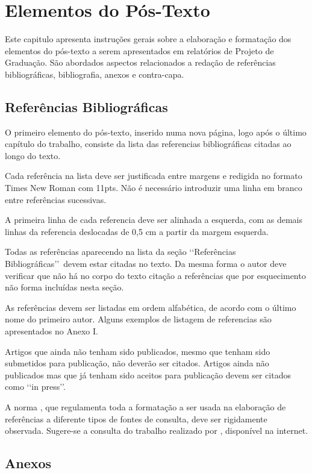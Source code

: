 \chapter[Elementos do Pós-Texto]{Elementos do Pós-Texto}

Este capitulo apresenta instruções gerais sobre a elaboração e formatação dos 
elementos do pós-texto a serem apresentados em relatórios de Projeto de 
Graduação. São abordados aspectos relacionados a redação de referências 
bibliográficas, bibliografia, anexos e contra-capa.

\section{Referências Bibliográficas}

O primeiro elemento do pós-texto, inserido numa nova página, logo após o último 
capítulo do trabalho, consiste da lista das referencias bibliográficas citadas 
ao longo do texto.

Cada referência na lista deve ser justificada entre margens e redigida no 
formato Times New Roman com 11pts. Não é necessário introduzir uma linha em 
branco entre referências sucessivas.

A primeira linha de cada referencia deve ser alinhada a esquerda, com as demais 
linhas da referencia deslocadas de 0,5 cm a partir da margem esquerda. 

Todas as referências aparecendo na lista da seção \lq\lq Referências 
Bibliográficas\rq\rq\ devem estar citadas no texto. Da mesma forma o autor deve 
verificar que não há no corpo do texto citação a referências que por 
esquecimento não forma incluídas nesta seção.

As referências devem ser listadas em ordem alfabética, de acordo com o último 
nome do primeiro autor. Alguns exemplos de listagem de referencias são 
apresentados no Anexo I.

Artigos que ainda não tenham sido publicados, mesmo que tenham sido submetidos 
para publicação, não deverão ser citados. Artigos ainda não publicados mas que 
já tenham sido aceitos para publicação devem ser citados como \lq\lq in 
press\rq\rq.

A norma \cite{NBR6034:2000}, que regulamenta toda a formatação a ser usada na 
elaboração de referências a diferente tipos de fontes de consulta, deve ser 
rigidamente observada. Sugere-se a consulta do trabalho realizado por 
\cite{arruda2007}, disponível na internet.

\section{Anexos}

